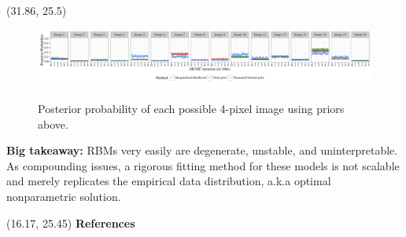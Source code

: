 \documentclass[extrafontsizes, 30pt]{memoir}
\begin{document}
\begin{textblock}{14.54}(31.86, 25.5)
\begin{figure}
\centering
\includegraphics{images/image_prediction.pdf}
\label{fig:image_pred}
\vspace*{-15mm}
\caption{Posterior probability of each possible 4-pixel image using priors above.}
\end{figure}

{\bfseries Big takeaway:} RBMs very easily are degenerate, unstable, and uninterpretable. As compounding issues, a rigorous fitting method for these models is not scalable and merely replicates the empirical data distribution, a.k.a optimal nonparametric solution.
\end{textblock}







\begin{textblock}{14.5}(16.17, 25.45)
{\large \bfseries References}
\printbibliography[heading=none]

\end{textblock}
\end{document}
